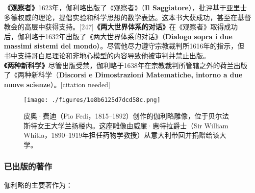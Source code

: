 \textbf{《观察者》}1623年，伽利略出版了《观察者》（\textbf{Il Saggiatore}），批评基于亚里士多德权威的理论，提倡实验和科学思想的数学表达。这本书大获成功，甚至在基督教会的高层中获得支持。[247]\textbf{《两大世界体系的对话》}在《观察者》取得成功后，伽利略于1632年出版了《两大世界体系的对话》（\textbf{Dialogo sopra i due massimi sistemi del mondo}）。尽管他尽力遵守宗教裁判所1616年的指示，但书中支持哥白尼理论和非地心模型的内容导致他被审判并禁止出版。\textbf{《两种新科学》}尽管出版受禁，伽利略于1638年在宗教裁判所管辖之外的荷兰出版了《两种新科学（\textbf{Discorsi e Dimostrazioni Matematiche, intorno a due nuove scienze}）。[citation needed]  
\begin{figure}[ht]
\centering
\texttt{[image: ./figures/1e8b6125d7dcd58c.png]}
\caption{皮奥·费迪（Pio Fedi，1815–1892）创作的伽利略雕像，位于贝尔法斯特女王大学兰扬楼内。这座雕像由威廉·惠特拉爵士（Sir William Whitla，1890–1919年担任药物学教授）从意大利带回并捐赠给该大学。} \label{fig_JLL_20}
\end{figure}
\subsubsection{已出版的著作}  

伽利略的主要著作为：  

